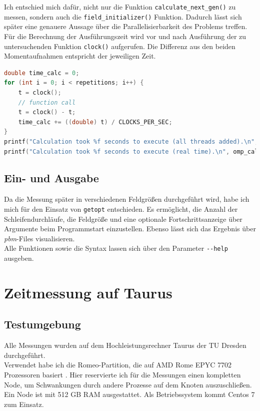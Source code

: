 \documentclass[german,plainarticle,hyperref,utf8]{zihpub}
\begin{document}
	Ich entschied mich dafür, nicht nur die Funktion \texttt{calculate\_next\_gen()} zu messen, sondern auch die \texttt{field\_initializer()} Funktion. Dadurch lässt sich später eine genauere Aussage über die Parallelisierbarkeit des Problems treffen. Für die Berechnung der Ausführungszeit wird vor und nach Ausführung der zu untersuchenden Funktion \texttt{clock()} aufgerufen. Die Differenz aus den beiden Momentaufnahmen entspricht der jeweiligen Zeit.\\
	\begin{lstlisting}[language=C, caption=Berechnung der Ausführungszeit eines \textit{function calls}]
double time_calc = 0;
for (int i = 0; i < repetitions; i++) {
	t = clock();
	// function call
	t = clock() - t;
	time_calc += ((double) t) / CLOCKS_PER_SEC;
}
printf("Calculation took %f seconds to execute (all threads added).\n", time_calc);
printf("Calculation took %f seconds to execute (real time).\n", omp_calc);
\end{lstlisting}
	
	\subsection{Ein- und Ausgabe}
	Da die Messung später in verschiedenen Feldgrößen durchgeführt wird, habe ich mich für den Einsatz von \verb|getopt| entschieden. Es ermöglicht, die Anzahl der Schleifendurchläufe, die Feldgröße und eine optionale Fortschrittsanzeige über Argumente beim Programmstart einzustellen.
	Ebenso lässt sich das Ergebnis über \textit{pbm}-Files visualisieren.\\
	Alle Funktionen sowie die Syntax lassen sich über den Parameter \texttt{-{}-help} ausgeben.
	\newpage
	\section{Zeitmessung auf Taurus}
	\subsection{Testumgebung} \label{umgebung}
	Alle Messungen wurden auf dem Hochleistungsrechner Taurus der TU Dresden durchgeführt.\\
	Verwendet habe ich die Romeo-Partition, die auf AMD Rome EPYC 7702 Prozessoren basiert \cite{hpc}. Hier reservierte ich für die Messungen einen kompletten Node, um Schwankungen durch andere Prozesse auf dem Knoten auszuschließen. Ein Node ist mit 512 GB RAM ausgestattet. Als Betriebssystem kommt Centos 7 zum Einsatz.\\
	
\end{document}
